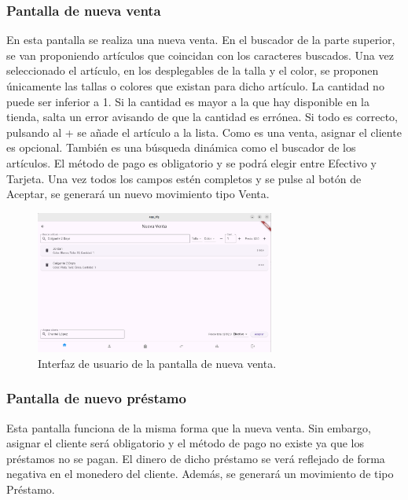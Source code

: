 \subsubsection{Pantalla de nueva venta}

En esta pantalla se realiza una nueva venta. En el buscador de la parte superior, se van proponiendo artículos que coincidan con los caracteres buscados. Una vez seleccionado el artículo, en los desplegables de la talla y el color, se proponen únicamente las tallas o colores que existan para dicho artículo. La cantidad no puede ser inferior a 1. Si la cantidad es mayor a la que hay disponible en la tienda, salta un error avisando de que la cantidad es errónea. Si todo es correcto, pulsando al + se añade el artículo a la lista. Como es una venta, asignar el cliente es opcional. También es una búsqueda dinámica como el buscador de los artículos. El método de pago es obligatorio y se podrá elegir entre Efectivo y Tarjeta. Una vez todos los campos estén completos y se pulse al botón de Aceptar, se generará un nuevo movimiento tipo Venta.

\begin{figure}[H]
	\centering
	\includegraphics[width=0.7\textwidth]{imagenes/SegundaIteracion/nuevaVenta.png}
	\caption{Interfaz de usuario de la pantalla de nueva venta.}
	\label{fig:appPantallaNuevaVenta}
\end{figure}

\subsubsection{Pantalla de nuevo préstamo}

Esta pantalla funciona de la misma forma que la nueva venta. Sin embargo, asignar el cliente será obligatorio y el método de pago no existe ya que los préstamos no se pagan. El dinero de dicho préstamo se verá reflejado de forma negativa en el monedero del cliente. Además, se generará un movimiento de tipo Préstamo. 

